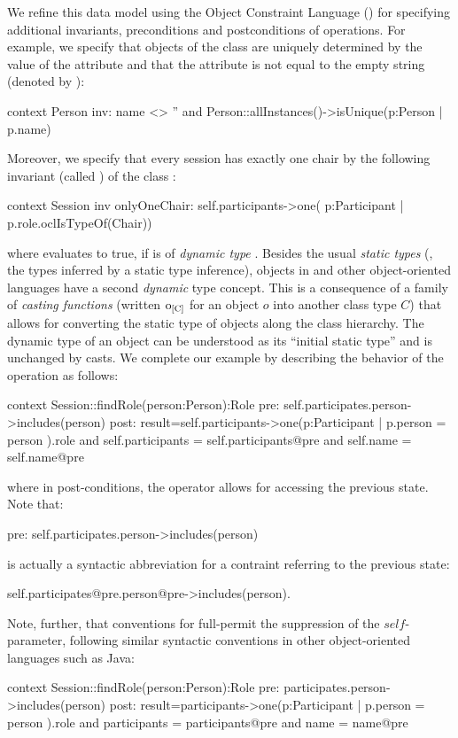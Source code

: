 We refine this data model using the Object Constraint Language (\OCL)
for specifying additional invariants, preconditions and postconditions
of operations. For example, we specify that objects of the class
 are uniquely determined by the value of the
 attribute and that the attribute  is
not equal to the empty string (denoted by ):
\begin{ocl}
context Person
  inv: name <> '' and
       Person::allInstances()->isUnique(p:Person | p.name)
\end{ocl}
Moreover, we specify that every session has exactly one chair by the
following invariant (called ) of the class
:
\begin{ocl}
context Session
  inv onlyOneChair: self.participants->one( p:Participant |
                                      p.role.oclIsTypeOf(Chair))
\end{ocl}
where  evaluates to true, if
 is of \emph{dynamic type}
. Besides the usual \emph{static types} (\ie, the
types inferred by a static type inference), objects in \UML and other
object-oriented languages have a second \emph{dynamic} type concept.
This is a consequence of a family of \emph{casting functions} (written
$\typeCast{o}{C}$ for an object $o$ into another class type $C$) that
allows for converting the static type of objects along the class
hierarchy. The dynamic type of an object can be understood as its
``initial static type'' and is unchanged by casts. We complete our
example by describing the behavior of the operation
 as follows:
\begin{ocl}
context Session::findRole(person:Person):Role
  pre:  self.participates.person->includes(person)
  post: result=self.participants->one(p:Participant |
                                p.person = person ).role
        and self.participants = self.participants@pre
        and self.name = self.name@pre
\end{ocl}
where in post-conditions, the operator  allows for
accessing the previous state. Note that:
\begin{ocl}
  pre:  self.participates.person->includes(person)
\end{ocl}
is actually a syntactic abbreviation for a contraint referring to
the previous state:
\begin{ocl}
        self.participates@pre.person@pre->includes(person).
\end{ocl}
Note, further, that conventions for full-\OCL permit the suppression
of the \inlineocl$self$-parameter, following similar syntactic conventions
in other object-oriented languages such as Java:
\begin{ocl}
context Session::findRole(person:Person):Role
  pre:  participates.person->includes(person)
  post: result=participants->one(p:Participant |
                                p.person = person ).role
        and participants = participants@pre
        and name = name@pre
\end{ocl}


